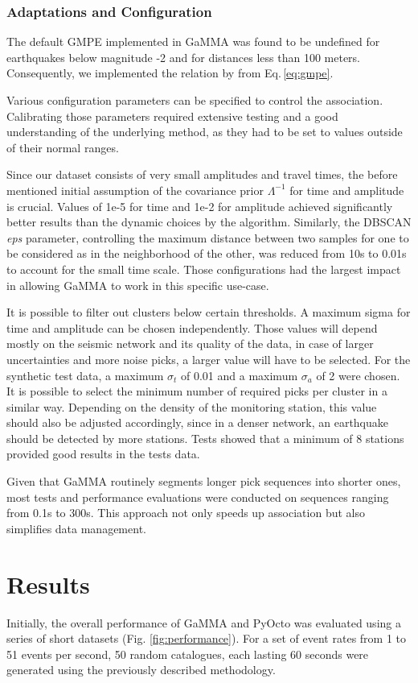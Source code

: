 \documentclass{scrreprt}
\begin{document}
\subsection{Adaptations and Configuration}

The default GMPE implemented in GaMMA was found to be undefined for earthquakes below magnitude -2 and for distances less than 100 meters. Consequently, we implemented the relation by \citet{butler1993apquant} from Eq.\,\ref{eq:gmpe}.

Various configuration parameters can be specified to control the association. Calibrating those parameters required extensive testing and a good understanding of the underlying method, as they had to be set to values outside of their normal ranges. 

Since our dataset consists of very small amplitudes and travel times, the before mentioned initial assumption of the covariance prior $\Lambda^{-1}$ for time and amplitude is crucial. Values of 1e-5 for time and 1e-2 for amplitude achieved significantly better results than the dynamic choices by the algorithm. Similarly, the DBSCAN \textit{eps} parameter, controlling the maximum distance between two samples for one to be considered as in the neighborhood of the other, was reduced from 10s to 0.01s to account for the small time scale. Those configurations had the largest impact in allowing GaMMA to work in this specific use-case.

It is possible to filter out clusters below certain thresholds. A maximum sigma for time and amplitude can be chosen independently. Those values will depend mostly on the seismic network and its quality of the data, in case of larger uncertainties and more noise picks, a larger value will have to be selected. For the synthetic test data, a maximum $\sigma_t$ of 0.01 and a maximum $\sigma_a$ of 2 were chosen. It is possible to select the minimum number of required picks per cluster in a similar way. Depending on the density of the monitoring station, this value should also be adjusted accordingly, since in a denser network, an earthquake should be detected by more stations. Tests showed that a minimum of 8 stations provided good results in the tests data.

Given that GaMMA routinely segments longer pick sequences into shorter ones, most tests and performance evaluations were conducted on sequences ranging from 0.1s to 300s. This approach not only speeds up association but also simplifies data management.

\chapter{Results}
Initially, the overall performance of GaMMA and PyOcto was evaluated using a series of short datasets (Fig. \ref{fig:performance}). For a set of event rates from 1 to 51 events per second, 50 random catalogues, each lasting 60 seconds were generated using the previously described methodology.
\end{document}
